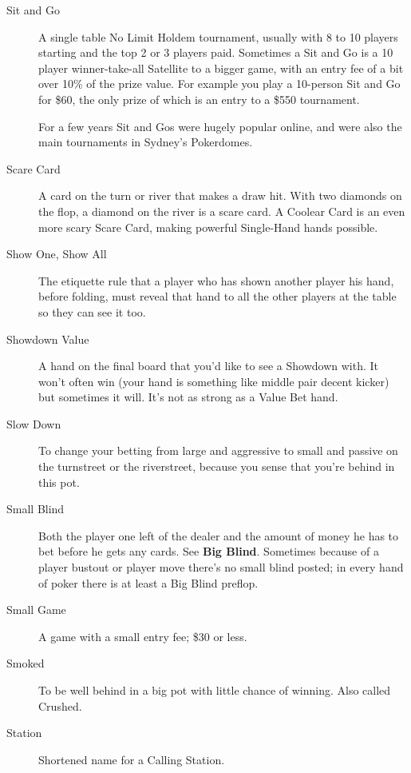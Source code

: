 \begin{description}
\item[Sit and Go] A single table No Limit Holdem tournament, usually
with 8 to 10 players starting and the top 2 or 3 players
paid. Sometimes a Sit and Go is a 10 player winner-take-all
Satellite to a bigger game, with an entry fee of a
bit over 10\% of the prize value. For example you play a 10-person
Sit and Go for \$60, the only prize of which is an entry to a \$550
tournament.

For a few years Sit and Gos were hugely popular online, and were also
the main tournaments in Sydney's Pokerdomes.

\item[Scare Card] A card on the turn or river that makes a draw hit.
With two diamonds on the flop, a diamond on the river is a scare card.
A Coolear Card is an even more scary Scare Card, making powerful
Single-Hand hands possible.

\item[Show One, Show All] The etiquette rule that a player who has
shown another player his hand, before folding, must reveal that hand
to all the other players at the table so they can see it too.

\item[Showdown Value] A hand on the final board that you'd like to see
a Showdown with. It won't often win (your hand is something like
middle pair decent kicker) but sometimes it will. It's not as strong
as a Value Bet hand.

\item[Slow Down] To change your betting from large and aggressive
to small and passive on the turnstreet or the riverstreet, because
you sense that you're behind in this pot.

\item[Small Blind] Both the player one left of the dealer and the
amount of money he has to bet before he gets any cards. See
\textbf{Big Blind}. Sometimes because of a player bustout or player
move there's no small blind posted; in every hand of poker there is at
least a Big Blind preflop.

\item[Small Game] A game with a small entry fee; \$30 or less.

\item[Smoked] To be well behind in a big pot with little chance of
winning. Also called Crushed.

\item[Station] Shortened name for a Calling Station.


\end{description}

